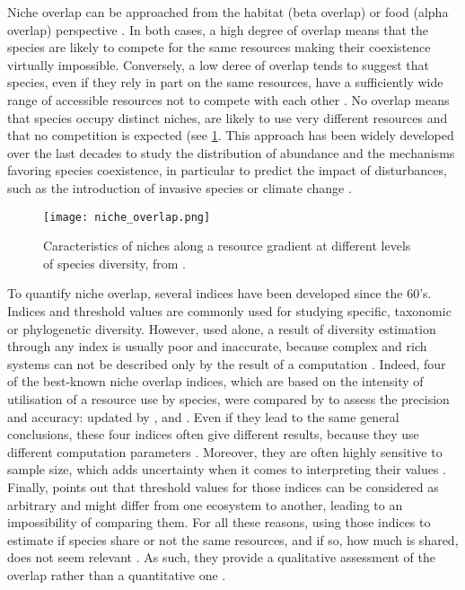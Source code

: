 Niche overlap can be approached from the habitat (beta overlap) or food (alpha overlap) perspective \citep{mouillot2005}. In both cases, a high degree of overlap means that the species are likely to compete for the same resources making their coexistence virtually impossible. Conversely, a low deree of overlap tends to suggest that species, even if they rely in part on the same resources, have a sufficiently wide range of accessible resources not to compete with each other \citep{mouillot2005}. No overlap means that species occupy distinct niches, are likely to use very different resources and that no competition is expected (see \ref{fig:lr1}. This approach has been widely developed over the last decades to study the distribution of abundance and the mechanisms favoring species coexistence, in particular to predict the impact of disturbances, such as the introduction of invasive species or climate change \citep{albouy2011,geange2011, martini2020}. 
\begin{figure} [!htbp]
	\begin{center}
		\texttt{[image: niche\_overlap.png]}
	\end{center}
	\caption[Petite légende]{Caracteristics of niches along a resource gradient at different levels of species diversity, from \citet{kim2020}.}
	\label{fig:lr1}
\end{figure}

To quantify niche overlap, several indices have been developed since the 60’s. Indices and threshold values are commonly used for studying specific, taxonomic or phylogenetic diversity. However, used alone, a result of diversity estimation through any index is usually poor and inaccurate, because complex and rich systems can not be described only by the result of a computation \citep{mejri2009}. Indeed, four of the best-known niche overlap indices, which are based on the intensity of utilisation of a resource use by species, were compared by \citet{linton1981} to assess the precision and accuracy: \citet{morisita1959} updated by \citet{horn1966}, \citet{schoener1968} and \citet{pianka1973}. Even if they lead to the same general conclusions, these four indices often give different results, because they use different computation parameters \citep{blondel1979}. Moreover, they are often highly sensitive to sample size, which adds uncertainty when it comes to interpreting their values \citep{linton1981}. Finally, \citet{grossman2009} points out that threshold values for those indices can be considered as arbitrary and might differ from one ecosystem to another, leading to an impossibility of comparing them. For all these reasons, using those indices to estimate if species share or not the same resources, and if so, how much is shared, does not seem relevant \citep{mouillot2005}. As such, they provide a qualitative assessment of the overlap rather than a quantitative one \citep{linton1981}.

